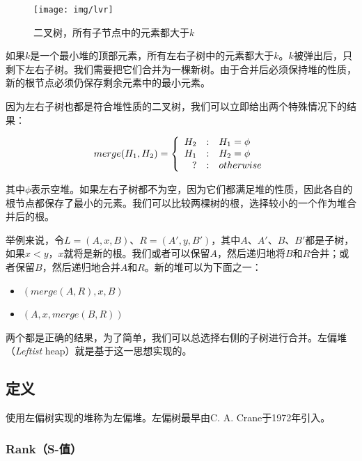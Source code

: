 \documentclass[b5paper]{ctexart}
\begin{document}
\begin{figure}[htbp]
    \centering
    \texttt{[image: img/lvr]}
    \caption{二叉树，所有子节点中的元素都大于$k$} \label{fig:lvr}
\end{figure}

如果$k$是一个最小堆的顶部元素，所有左右子树中的元素都大于$k$。$k$被弹出后，只剩下左右子树。我们需要把它们合并为一棵新树。由于合并后必须保持堆的性质，新的根节点必须仍保存剩余元素中的最小元素。

因为左右子树也都是符合堆性质的二叉树，我们可以立即给出两个特殊情况下的结果：

\[
merge(H_1, H_2) = \left \{
  \begin{array}
  {r@{\quad:\quad}l}
  H_2 & H_1 = \phi \\
  H_1 & H_2 = \phi \\
  ? & otherwise
  \end{array}
\right.
\]

其中$\phi$表示空堆。如果左右子树都不为空，因为它们都满足堆的性质，因此各自的根节点都保存了最小的元素。我们可以比较两棵树的根，选择较小的一个作为堆合并后的根。

举例来说，令$L = (A, x, B)$、$R = (A', y, B')$，其中$A$、$A'$、$B$、$B'$都是子树，如果$x < y$，$x$就将是新的根。我们或者可以保留$A$，然后递归地将$B$和$R$合并；或者保留$B$，然后递归地合并$A$和$R$。新的堆可以为下面之一：

\begin{itemize}
\item $(merge(A, R), x, B)$
\item $(A, x, merge(B, R))$
\end{itemize}

两个都是正确的结果，为了简单，我们可以总选择右侧的子树进行合并。左偏堆（{\em Leftist} heap）就是基于这一思想实现的。

\subsection{定义}

使用左偏树实现的堆称为左偏堆。左偏树最早由C. A. Crane于1972年引入\cite{wiki-leftist-tree}。

\subsubsection{Rank（S-值）}
\end{document}
